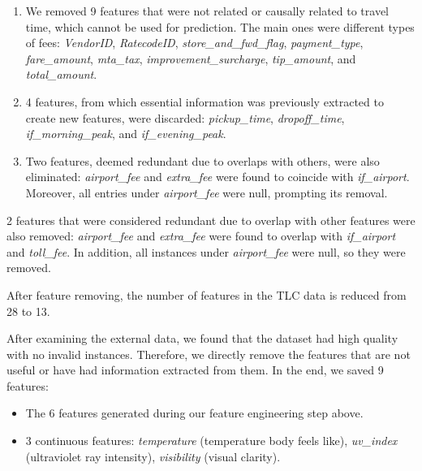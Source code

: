 \documentclass[11pt]{article}
\begin{document}
\begin{enumerate}
    \item We removed 9 features that were not related or causally related to travel time, which cannot be used for prediction. The main ones were different types of fees: \textit{VendorID}, \textit{RatecodeID}, \textit{store\_and\_fwd\_flag}, \textit{payment\_type}, \textit{fare\_amount}, \textit{mta\_tax}, \textit{improvement\_surcharge}, \textit{tip\_amount}, and \textit{total\_amount}.
    
    \item 4 features, from which essential information was previously extracted to create new features, were discarded: \textit{pickup\_time}, \textit{dropoff\_time}, \textit{if\_morning\_peak}, and \textit{if\_evening\_peak}.
    
    \item Two features, deemed redundant due to overlaps with others, were also eliminated: \textit{airport\_fee} and \textit{extra\_fee} were found to coincide with \textit{if\_airport}. Moreover, all entries under \textit{airport\_fee} were null, prompting its removal.
\end{enumerate}

2 features that were considered redundant due to overlap with other features were also removed: \textit{airport\_fee} and \textit{extra\_fee} were found to overlap with \textit{if\_airport} and \textit{toll\_fee}. In addition, all instances under \textit{airport\_fee} were null, so they were removed.

After feature removing, the number of features in the TLC data is reduced from 28 to 13.

After examining the external data, we found that the dataset had high quality with no invalid instances. Therefore, we directly remove the features that are not useful or have had information extracted from them. In the end, we saved 9 features:

\begin{itemize}
    \item The 6 features generated during our feature engineering step above.
    \item 3 continuous features: \textit{temperature} (temperature body feels like), \textit{uv\_index} (ultraviolet ray intensity), \textit{visibility} (visual clarity).
\end{itemize}
\end{document}
